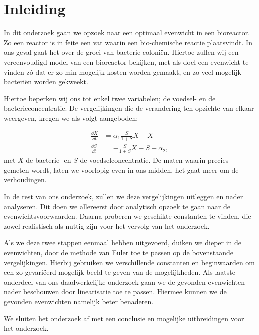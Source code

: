 
\chapter{Inleiding}
\label{Inleiding}
In dit onderzoek gaan we opzoek naar een optimaal evenwicht in een bioreactor. Zo een reactor is in feite een vat waarin  een bio-chemische reactie plaatsvindt. In ons geval gaat het over de groei van bacterie-coloni\"en. Hiertoe zullen wij een vereenvoudigd model van een bioreactor bekijken, met als doel een evenwicht te vinden z\'o dat er zo min mogelijk kosten worden gemaakt, en zo veel mogelijk bacteri\"en worden gekweekt. 

Hiertoe beperken wij ons tot enkel twee variabelen; de voedsel- en de bacterieconcentratie. De vergelijkingen die de verandering ten opzichte van elkaar weergeven, kregen we als volgt aangeboden:
	
\begin{align}
	\frac{\dd X}{\dd t} &= \alpha_1 \frac{S}{1 + S} X - X 				\\
	\frac{\dd S}{\dd t} &= - \frac{S}{1 + S}X - S + \alpha_2, 		
\end{align}
met $X$ de bacterie- en $S$ de voedselconcentratie. De maten waarin precies gemeten wordt, laten we voorlopig even in ons midden, het gaat meer om de verhoudingen. 

In de rest van ons onderzoek, zullen we deze vergelijkingen uitleggen en nader analyseren. Dit doen we allereerst door analytisch opzoek te gaan naar de evenwichtsvoorwaarden. Daarna proberen we geschikte constanten te vinden, die zowel realistisch als nuttig zijn voor het vervolg van het onderzoek.

Als we deze twee stappen eenmaal hebben uitgevoerd, duiken we dieper in de evenwichten, door de methode van Euler toe te passen op de bovenstaande vergelijkingen. Hierbij gebruiken we verschillende constanten en beginwaarden om een zo gevari\"eerd mogelijk beeld te geven van de mogelijkheden. Als laatste onderdeel van ons daadwerkelijke onderzoek gaan we de gevonden evenwichten nader beschouwen door linearisatie toe te passen. Hiermee kunnen we de gevonden evenwichten namelijk beter benaderen. 

We sluiten het onderzoek af met een conclusie en mogelijke uitbreidingen voor het onderzoek. 